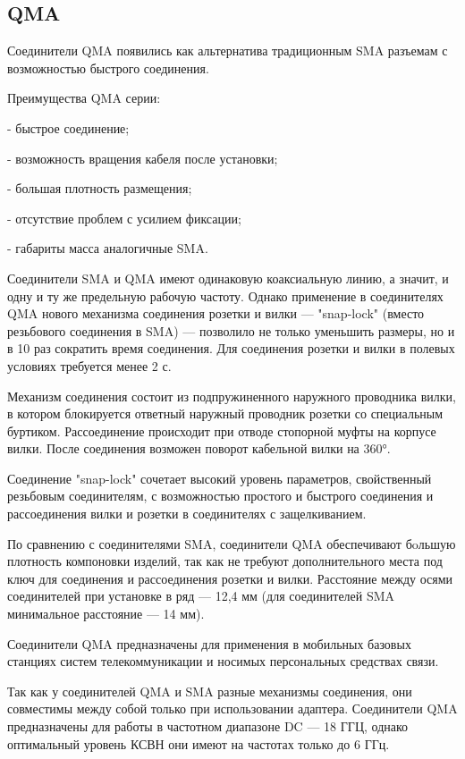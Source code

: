 \documentclass[%
	11pt,
	a4paper,
	utf8,
		]{article}
\begin{document}
\subsection{QMA}

Соединители QMA появились как альтернатива
традиционным SMA разъемам с возможностью быстрого
соединения. 

Преимущества QMA серии:

- быстрое соединение;

- возможность вращения кабеля после установки;

- большая плотность размещения;

- отсутствие проблем с усилием фиксации;

- габариты масса аналогичные SMA. 

Соединители SMA и QMA имеют одинаковую коаксиальную линию, а значит, и одну и ту же предельную рабочую частоту. Однако применение в соединителях QMA нового механизма соединения розетки и вилки — "snap-lock" (вместо резьбового соединения в SMA) — позволило не только уменьшить размеры, но и в 10 раз сократить время соединения. Для соединения розетки и вилки в полевых условиях требуется менее 2 с.

Механизм соединения состоит из подпружиненного наружного проводника вилки, в котором блокируется ответный наружный проводник розетки со специальным буртиком. Рассоединение происходит при отводе стопорной муфты на корпусе вилки. После соединения возможен поворот кабельной вилки на 360°.

Соединение "snap-lock" сочетает высокий уровень параметров, свойственный резьбовым соединителям, с возможностью простого и быстрого соединения и рассоединения вилки и розетки в соединителях с защелкиванием.

По сравнению с соединителями SMA, соединители QMA обеспечивают бoльшую плотность компоновки изделий, так как не требуют дополнительного места под ключ для соединения и рассоединения розетки и вилки. Расстояние между осями соединителей при установке в ряд — 12,4 мм (для соединителей SMA минимальное расстояние — 14 мм).

Соединители QMA предназначены для применения в мобильных базовых станциях систем телекоммуникации и носимых персональных средствах связи.

Так как у соединителей QMA и SMA разные механизмы соединения, они совместимы между собой только при использовании адаптера. Соединители QMA предназначены для работы в частотном диапазоне DC — 18 ГГЦ, однако оптимальный уровень КСВН они имеют на частотах только до 6 ГГц.
\end{document}
